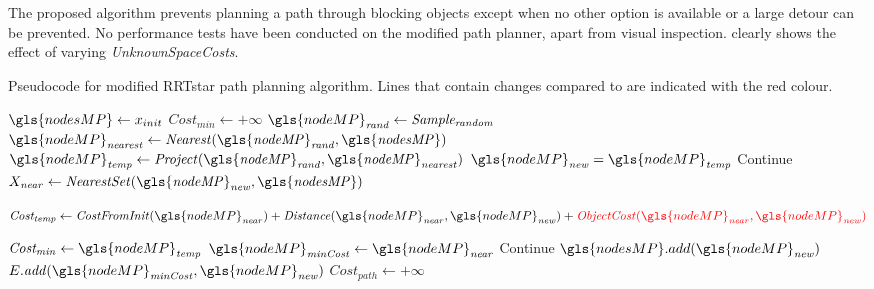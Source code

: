 The proposed algorithm prevents planning a path through blocking objects except when no other option is available or a large detour can be prevented. No performance tests have been conducted on the modified path planner, apart from visual inspection.  clearly shows the effect of varying \textit{UnknownSpaceCosts}.


\begin{algorithm}[H]
  \caption{Pseudocode for modified \ac{RRTstar} path planning algorithm. Lines that contain changes compared to  are indicated with the red colour.}%
  \label{pseudocode:modified_proposed_rrt_star}
  \begin{algorithmic}[1]

    \State $\gls{nodesMP} \leftarrow x_{init}$
      \State $Cost_\mathit{min} \leftarrow +\infty$ 
      \State $\gls{nodeMP}_\mathit{rand} \leftarrow \mathit{Sample_{random}}$
      \State $\gls{nodeMP}_\mathit{nearest} \leftarrow \mathit{Nearest(\gls{nodeMP}_{rand}, \gls{nodesMP})}$
      \State $\gls{nodeMP}_\mathit{temp} \leftarrow \mathit{Project(\gls{nodeMP}_{rand}, \gls{nodeMP}_{nearest})}$
      \State $\gls{nodeMP}_\mathit{new} = \gls{nodeMP}_\mathit{temp}$
      \Else
      \State Continue
      \EndIf
      \State $X_\mathit{near} \leftarrow \mathit{NearestSet(\gls{nodeMP}_{new}, \gls{nodesMP})}$ 

    \State $\mathit{Cost_{temp}} \leftarrow \mathit{CostFromInit}(\gls{nodeMP}_\mathit{near}) + \mathit{Distance}(\gls{nodeMP}_\mathit{near}, \gls{nodeMP}_\mathit{new}) + \textcolor{red}{\mathit{ObjectCost}(\gls{nodeMP}_\mathit{near}, \gls{nodeMP}_\mathit{new})}$

      \State $\mathit{Cost_{min}} \leftarrow \gls{nodeMP}_\mathit{temp}$
      \State $\gls{nodeMP}_\mathit{minCost} \leftarrow \gls{nodeMP}_\mathit{near}$
      \EndIf
      \EndFor
      \State Continue
      \Else
      \State $\gls{nodesMP}.add(\gls{nodeMP}_\mathit{new})$
      \State $E.\mathit{add}(\gls{nodeMP}_\mathit{minCost}, \gls{nodeMP}_\mathit{new})$
      \EndIf
      \State $\mathit{Cost_{path}} \leftarrow +\infty$ 


\end{algorithmic}
\end{algorithm}
